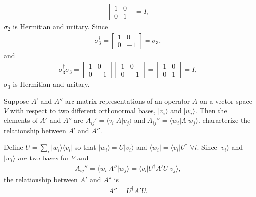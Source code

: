\documentclass[en]{sol-man}
\begin{document}
\begin{pf}
\begin{align}
\begin{bmatrix}
            1&0\\
            0&1
        \end{bmatrix}=I,
    \end{align}
    $\sigma_2$ is Hermitian and unitary.
    Since
    \begin{align}
        \sigma_3^{\dagger}=\begin{bmatrix}
            1&0\\
            0&-1
        \end{bmatrix}=\sigma_3,
    \end{align}
    and
    \begin{align}
        \sigma_3^{\dagger}\sigma_3=\begin{bmatrix}
            1&0\\
            0&-1
        \end{bmatrix}\begin{bmatrix}
            1&0\\
            0&-1
        \end{bmatrix}=\begin{bmatrix}
            1&0\\
            0&1
        \end{bmatrix}=I,
    \end{align}
    $\sigma_3$ is Hermitian and unitary.
\end{pf}

\begin{exe}
    Suppose $A'$ and $A''$ are matrix representations of an operator $A$ on a vector space $V$ with respect to two different orthonormal bases, $\lvert v_i\rangle$ and $\lvert w_i\rangle$. Then the elements of $A'$ and $A''$ are $A_{ij}'=\langle v_i\rvert A\lvert v_j\rangle$ and $A_{ij}''=\langle w_i\rvert A\lvert w_j\rangle$. characterize the relationship between $A'$ and $A''$.
\end{exe}
\begin{sol}
    Define $U=\sum_i\lvert w_i\rangle\langle v_i\rvert$ so that $\lvert w_i\rangle=U\lvert v_i\rangle$ and $\langle w_i\rvert=\langle v_i\rvert U^{\dagger}$ $\forall i$. Since $\lvert v_i\rangle$ and $\lvert w_i\rangle$ are two bases for $V$ and
    \begin{align}
        A_{ij}''=\langle w_i\rvert A''\lvert w_j\rangle=\langle v_i\rvert U^{\dagger}A'U\lvert v_j\rangle,
    \end{align}
    the relationship between $A'$ and $A''$ is
    \begin{align}
        A''=U^{\dagger}A'U.
    \end{align}
\end{sol}
\end{document}
